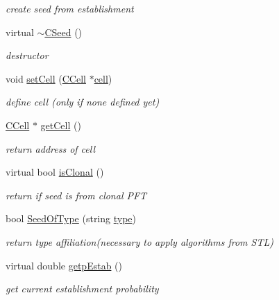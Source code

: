 \begin{DoxyCompactItemize}
\begin{DoxyCompactList}\small\item\em create seed from establishment \end{DoxyCompactList}\item 
\mbox{\label{class_c_seed_a29d4e2c3d5f3baa52534ba739f93cb4d}} 
virtual \mbox{\hyperlink{class_c_seed_a29d4e2c3d5f3baa52534ba739f93cb4d}{$\sim$\+C\+Seed}} ()
\begin{DoxyCompactList}\small\item\em destructor \end{DoxyCompactList}\item 
void \mbox{\hyperlink{class_c_seed_a54b3d0dad6fbbaf13731df172190454f}{set\+Cell}} (\mbox{\hyperlink{class_c_cell}{C\+Cell}} $\ast$\mbox{\hyperlink{class_c_seed_a93f258be6fe7841d52daa4e9e362c00e}{cell}})
\begin{DoxyCompactList}\small\item\em define cell (only if none defined yet) \end{DoxyCompactList}\item 
\mbox{\label{class_c_seed_a0c916c710b1325761ebd268d9ed4a560}} 
\mbox{\hyperlink{class_c_cell}{C\+Cell}} $\ast$ \mbox{\hyperlink{class_c_seed_a0c916c710b1325761ebd268d9ed4a560}{get\+Cell}} ()
\begin{DoxyCompactList}\small\item\em return address of cell \end{DoxyCompactList}\item 
\mbox{\label{class_c_seed_a4da6513ccd7dc241729d0f98fc20f7f7}} 
virtual bool \mbox{\hyperlink{class_c_seed_a4da6513ccd7dc241729d0f98fc20f7f7}{is\+Clonal}} ()
\begin{DoxyCompactList}\small\item\em return if seed is from clonal P\+FT \end{DoxyCompactList}\item 
\mbox{\label{class_c_seed_a0d8fa2429de3dbf628c1928197e8530b}} 
bool \mbox{\hyperlink{class_c_seed_a0d8fa2429de3dbf628c1928197e8530b}{Seed\+Of\+Type}} (string \mbox{\hyperlink{class_c_seed_a0e10c5ee3d7a6bf14226de5a5728b2a4}{type}})
\begin{DoxyCompactList}\small\item\em return type affiliation(necessary to apply algorithms from S\+T\+L) \end{DoxyCompactList}\item 
virtual double \mbox{\hyperlink{class_c_seed_a6845f39091b1c9d8c31a9ee87ca8f8f0}{getp\+Estab}} ()
\begin{DoxyCompactList}\small\item\em get current establishment probability \end{DoxyCompactList}\end{DoxyCompactItemize}
